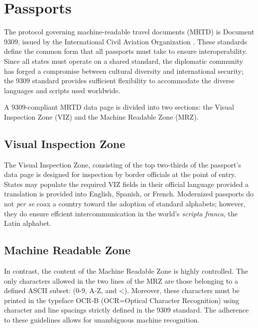\section{Passports}

The protocol governing machine-readable travel documents (MRTD) is Document
9309, issued by the International Civil Aviation Organization
\parencite{ICAO9309}. These standards define the common form that all passports
must take to ensure interoperability. Since all states must operate on a shared
standard, the diplomatic community has forged a compromise between cultural
diversity and international security; the 9309 standard provides sufficient
flexibility to accommodate the diverse languages and scripts used worldwide.

A 9309-compliant MRTD data page is divided into two sections: the Visual
Inspection Zone (VIZ) and the Machine Readable Zone (MRZ).

\subsection{Visual Inspection Zone}

The Visual Inspection Zone, consisting of the top two-thirds of the passport's
data page is designed for inspection by border officials at the point of entry.
States may populate the required VIZ fields in their official language provided
a translation is provided into English, Spanish, or French. Modernized passports
do not \textit{per se} coax a country toward the adoption of standard alphabets;
however, they do ensure effcient intercommunication in the world's
\textit{scripta franca}, the Latin alphabet.

\subsection{Machine Readable Zone}

In contrast, the content of the Machine Readable Zone is highly controlled. The
only characters allowed in the two lines of the MRZ are those belonging to a
defined ASCII subset: (0-9, A-Z, and <). Moreover, these characters must be
printed in the typeface OCR-B (OCR=Optical Character Recognition) using
character and line spacings strictly defined in the 9309 standard. The adherence
to these guidelines allows for unambiguous machine recognition.

